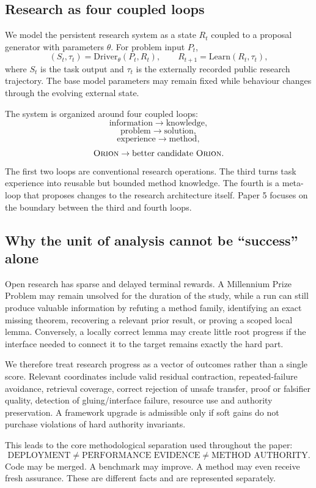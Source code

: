 \subsection{Research as four coupled loops}

We model the persistent research system as a state $R_t$ coupled to a proposal generator with parameters $\theta$. For problem input $P_t$,
\[
(S_t,\tau_t)=\mathrm{Driver}_{\theta}(P_t,R_t),
\qquad
R_{t+1}=\mathrm{Learn}(R_t,\tau_t),
\]
where $S_t$ is the task output and $\tau_t$ is the externally recorded public research trajectory. The base model parameters may remain fixed while behaviour changes through the evolving external state.

The system is organized around four coupled loops:
\[
\text{information}\rightarrow\text{knowledge},
\]
\[
\text{problem}\rightarrow\text{solution},
\]
\[
\text{experience}\rightarrow\text{method},
\]
\[
\textsc{Orion}{}\rightarrow\text{better candidate \textsc{Orion}{}}.
\]
The first two loops are conventional research operations. The third turns task experience into reusable but bounded method knowledge. The fourth is a meta-loop that proposes changes to the research architecture itself. Paper 5 focuses on the boundary between the third and fourth loops.

\subsection{Why the unit of analysis cannot be ``success'' alone}

Open research has sparse and delayed terminal rewards. A Millennium Prize Problem may remain unsolved for the duration of the study, while a run can still produce valuable information by refuting a method family, identifying an exact missing theorem, recovering a relevant prior result, or proving a scoped local lemma. Conversely, a locally correct lemma may create little root progress if the interface needed to connect it to the target remains exactly the hard part.

We therefore treat research progress as a vector of outcomes rather than a single score. Relevant coordinates include valid residual contraction, repeated-failure avoidance, retrieval coverage, correct rejection of unsafe transfer, proof or falsifier quality, detection of gluing/interface failure, resource use and authority preservation. A framework upgrade is admissible only if soft gains do not purchase violations of hard authority invariants.

This leads to the core methodological separation used throughout the paper:
\[
\boxed{\text{DEPLOYMENT} \neq \text{PERFORMANCE EVIDENCE} \neq \text{METHOD AUTHORITY}}.
\]
Code may be merged. A benchmark may improve. A method may even receive fresh assurance. These are different facts and are represented separately.
